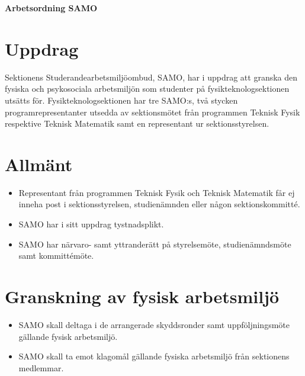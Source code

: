 

\renewcommand{\dateseparator}{-} %

\renewcommand{\forening}{SAMO}

\begin{center}
\LARGE{\textbf{Arbetsordning \forening}}
\end{center}



\section{Uppdrag}
Sektionens Studerandearbetsmiljöombud, SAMO, har i uppdrag att granska den fysiska och psykosociala arbetsmiljön som studenter på fysikteknologsektionen utsätts för.
Fysikteknologsektionen har tre SAMO:s, två stycken programrepresentanter utsedda av sektionsmötet från programmen Teknisk Fysik respektive Teknisk Matematik samt en representant ur sektionsstyrelsen.

\section{Allmänt}
\begin{itemize}
\item Representant från programmen Teknisk Fysik och Teknisk Matematik får ej inneha post i sektionsstyrelsen, studienämnden eller någon sektionskommitté.

\item SAMO har i sitt uppdrag tystnadsplikt.

\item SAMO har närvaro- samt yttranderätt på styrelsemöte, studienämndsmöte samt kommittémöte.

\end{itemize}

\section{Granskning av fysisk arbetsmiljö}
\begin{itemize}
\item SAMO skall deltaga i de arrangerade skyddsronder samt uppföljningsmöte gällande fysisk arbetsmiljö.

\item SAMO skall ta emot klagomål gällande fysiska arbetsmiljö från sektionens medlemmar.

\end{itemize}


